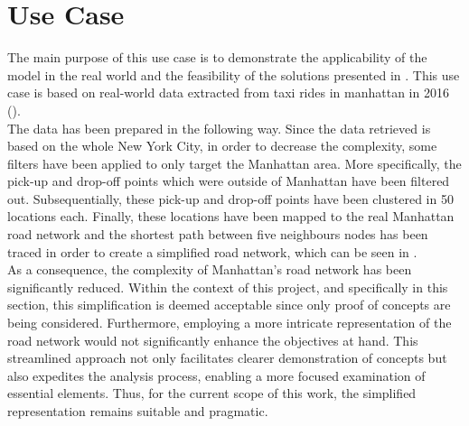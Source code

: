 \section{Use Case}
The main purpose of this use case is to demonstrate the applicability of the model in the real world and the feasibility of the solutions presented in . This use case is based on real-world data extracted from taxi rides in manhattan in 2016 (\cite{Donovan2014}). \\
The data has been prepared in the following way. Since the data retrieved is based on the whole New York City, in order to decrease the complexity, some filters have been applied to only target the Manhattan area. More specifically, the pick-up and drop-off points which were outside of Manhattan have been filtered out. Subsequentially, these pick-up and drop-off points have been clustered in 50 locations each. Finally, these locations have been mapped to the real Manhattan road network and the shortest path between five neighbours nodes has been traced in order to create a simplified road network, which can be seen in . \\
As a consequence, the complexity of Manhattan's road network has been significantly reduced. Within the context of this project, and specifically in this section, this simplification is deemed acceptable since only proof of concepts are being considered. Furthermore, employing a more intricate representation of the road network would not significantly enhance the objectives at hand. This streamlined approach not only facilitates clearer demonstration of concepts but also expedites the analysis process, enabling a more focused examination of essential elements. Thus, for the current scope of this work, the simplified representation remains suitable and pragmatic.
